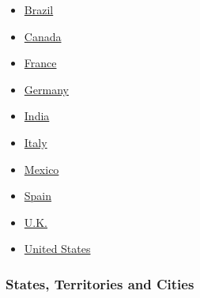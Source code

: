 \begin{itemize}
\tightlist
\item
  \href{https://www.nytimes3xbfgragh.onion/interactive/2020/world/americas/brazil-coronavirus-cases.html}{Brazil}
\item
  \href{https://www.nytimes3xbfgragh.onion/interactive/2020/world/canada/canada-coronavirus-cases.html}{Canada}
\item
  \href{https://www.nytimes3xbfgragh.onion/interactive/2020/world/europe/france-coronavirus-cases.html}{France}
\item
  \href{https://www.nytimes3xbfgragh.onion/interactive/2020/world/europe/germany-coronavirus-cases.html}{Germany}
\item
  \href{https://www.nytimes3xbfgragh.onion/interactive/2020/world/asia/india-coronavirus-cases.html}{India}
\item
  \href{https://www.nytimes3xbfgragh.onion/interactive/2020/world/europe/italy-coronavirus-cases.html}{Italy}
\item
  \href{https://www.nytimes3xbfgragh.onion/interactive/2020/world/americas/mexico-coronavirus-cases.html}{Mexico}
\item
  \href{https://www.nytimes3xbfgragh.onion/interactive/2020/world/europe/spain-coronavirus-cases.html}{Spain}
\item
  \href{https://www.nytimes3xbfgragh.onion/interactive/2020/world/europe/united-kingdom-coronavirus-cases.html}{U.K.}
\item
  \href{https://www.nytimes3xbfgragh.onion/interactive/2020/us/coronavirus-us-cases.html}{United
  States}
\end{itemize}

\hypertarget{states-territories-and-cities}{%
\subsubsection{States, Territories and
Cities}\label{states-territories-and-cities}}

